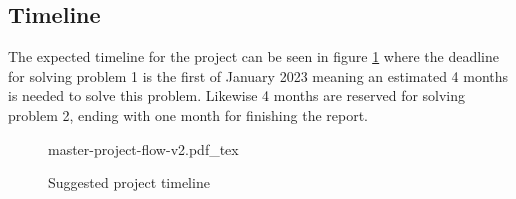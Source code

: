 \documentclass{article}
\begin{document}



\subsection*{Timeline}
The expected timeline for the project can be seen in figure \ref{suggested-project-timeline} where the deadline for solving problem 1 is the first of January 2023 meaning an estimated 4 months is needed to solve this problem. Likewise 4 months are reserved for solving problem 2, ending with one month for finishing the report.

\begin{figure}[h!]
\centering
{master-project-flow-v2.pdf_tex}
\caption{Suggested project timeline}
\label{suggested-project-timeline}
\end{figure}
\end{document}
